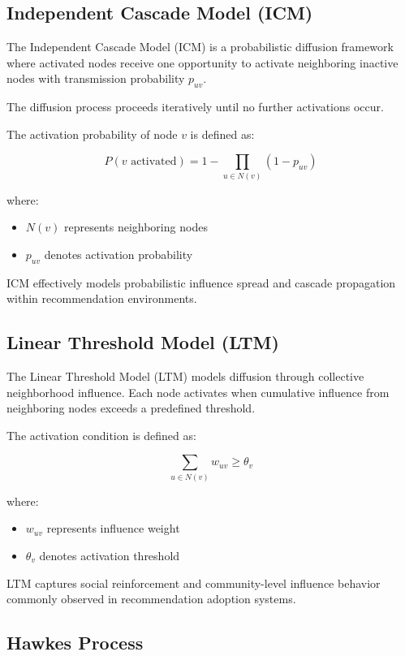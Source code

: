 \documentclass{article}
\begin{document}
\subsection{Independent Cascade Model (ICM)}

The Independent Cascade Model (ICM) is a probabilistic diffusion framework where activated nodes receive one opportunity to activate neighboring inactive nodes with transmission probability \(p_{uv}\).

The diffusion process proceeds iteratively until no further activations occur.

The activation probability of node \(v\) is defined as:

\[
P(v \text{ activated}) = 1 - \prod_{u \in N(v)} (1 - p_{uv})
\]

where:
\begin{itemize}
\item \(N(v)\) represents neighboring nodes
\item \(p_{uv}\) denotes activation probability
\end{itemize}

ICM effectively models probabilistic influence spread and cascade propagation within recommendation environments.

\subsection{Linear Threshold Model (LTM)}

The Linear Threshold Model (LTM) models diffusion through collective neighborhood influence. Each node activates when cumulative influence from neighboring nodes exceeds a predefined threshold.

The activation condition is defined as:

\[
\sum_{u \in N(v)} w_{uv} \geq \theta_v
\]

where:
\begin{itemize}
\item \(w_{uv}\) represents influence weight
\item \(\theta_v\) denotes activation threshold
\end{itemize}

LTM captures social reinforcement and community-level influence behavior commonly observed in recommendation adoption systems.

\subsection{Hawkes Process}
\end{document}
